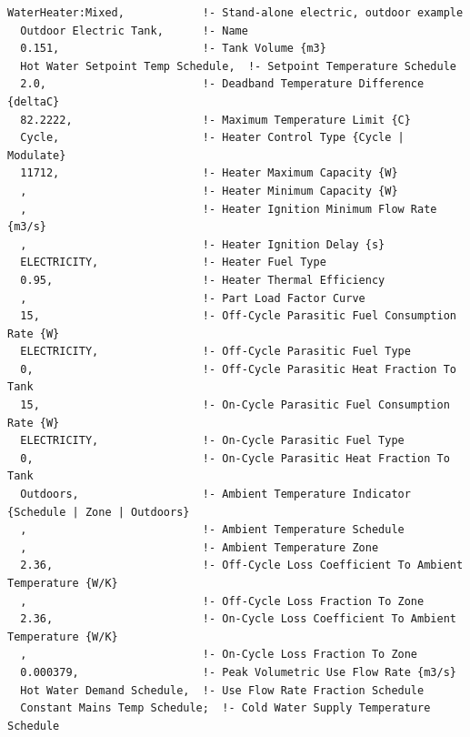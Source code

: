\begin{lstlisting}
WaterHeater:Mixed,            !- Stand-alone electric, outdoor example
  Outdoor Electric Tank,      !- Name
  0.151,                      !- Tank Volume {m3}
  Hot Water Setpoint Temp Schedule,  !- Setpoint Temperature Schedule
  2.0,                        !- Deadband Temperature Difference {deltaC}
  82.2222,                    !- Maximum Temperature Limit {C}
  Cycle,                      !- Heater Control Type {Cycle | Modulate}
  11712,                      !- Heater Maximum Capacity {W}
  ,                           !- Heater Minimum Capacity {W}
  ,                           !- Heater Ignition Minimum Flow Rate {m3/s}
  ,                           !- Heater Ignition Delay {s}
  ELECTRICITY,                !- Heater Fuel Type
  0.95,                       !- Heater Thermal Efficiency
  ,                           !- Part Load Factor Curve
  15,                         !- Off-Cycle Parasitic Fuel Consumption Rate {W}
  ELECTRICITY,                !- Off-Cycle Parasitic Fuel Type
  0,                          !- Off-Cycle Parasitic Heat Fraction To Tank
  15,                         !- On-Cycle Parasitic Fuel Consumption Rate {W}
  ELECTRICITY,                !- On-Cycle Parasitic Fuel Type
  0,                          !- On-Cycle Parasitic Heat Fraction To Tank
  Outdoors,                   !- Ambient Temperature Indicator {Schedule | Zone | Outdoors}
  ,                           !- Ambient Temperature Schedule
  ,                           !- Ambient Temperature Zone
  2.36,                       !- Off-Cycle Loss Coefficient To Ambient Temperature {W/K}
  ,                           !- Off-Cycle Loss Fraction To Zone
  2.36,                       !- On-Cycle Loss Coefficient To Ambient Temperature {W/K}
  ,                           !- On-Cycle Loss Fraction To Zone
  0.000379,                   !- Peak Volumetric Use Flow Rate {m3/s}
  Hot Water Demand Schedule,  !- Use Flow Rate Fraction Schedule
  Constant Mains Temp Schedule;  !- Cold Water Supply Temperature Schedule


\end{lstlisting}
